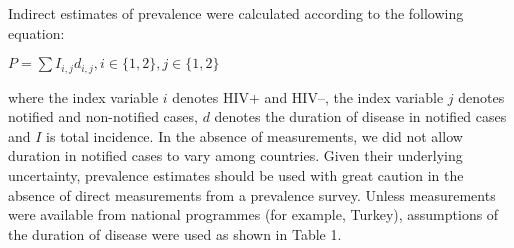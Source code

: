 Indirect estimates of prevalence were calculated according to the following equation:

$P = \sum I_{i,j} d_{i,j}, i \in \lbrace 1, 2\rbrace, j \in \lbrace 1, 2\rbrace$

where the index variable $i$ denotes HIV+ and HIV–, the index variable $j$ denotes notified and non-notified cases, $d$ denotes the duration of disease in notified cases and $I$ is total incidence. In the absence of measurements, we did not allow duration in notified cases to vary among countries. Given their underlying uncertainty, prevalence estimates should be used with great caution in the absence of direct measurements from a prevalence survey. Unless measurements were available from national programmes (for example, Turkey), assumptions of the duration of disease were used as shown in Table 1.



  